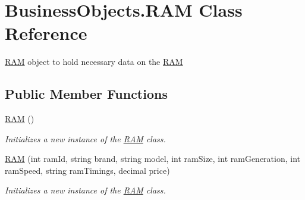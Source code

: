 \hypertarget{class_business_objects_1_1_r_a_m}{}\section{Business\+Objects.\+R\+AM Class Reference}
\label{class_business_objects_1_1_r_a_m}


\hyperlink{class_business_objects_1_1_r_a_m}{R\+AM} object to hold necessary data on the \hyperlink{class_business_objects_1_1_r_a_m}{R\+AM}  


\subsection*{Public Member Functions}
\begin{DoxyCompactItemize}
\item 
\hyperlink{class_business_objects_1_1_r_a_m_ae7ed2981f24613ded0d4548f69c21fd2}{R\+AM} ()
\begin{DoxyCompactList}\small\item\em Initializes a new instance of the \hyperlink{class_business_objects_1_1_r_a_m}{R\+AM} class. \end{DoxyCompactList}\item 
\hyperlink{class_business_objects_1_1_r_a_m_ad7c04e059617e0e6079a522b094447ee}{R\+AM} (int ram\+Id, string brand, string model, int ram\+Size, int ram\+Generation, int ram\+Speed, string ram\+Timings, decimal price)
\begin{DoxyCompactList}\small\item\em Initializes a new instance of the \hyperlink{class_business_objects_1_1_r_a_m}{R\+AM} class. \end{DoxyCompactList}\end{DoxyCompactItemize}
